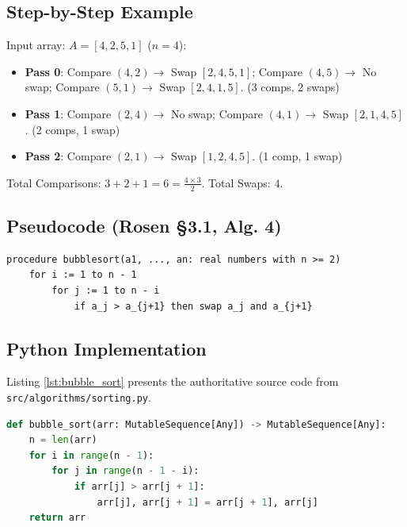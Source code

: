 \documentclass[11pt,a4paper,oneside]{report}
\theoremstyle{definition}
\begin{document}
\subsection{Step-by-Step Example}
Input array: $A = [4, 2, 5, 1]$ ($n = 4$):
\begin{itemize}
    \item \textbf{Pass 0}: Compare $(4, 2) \to$ Swap $[2, 4, 5, 1]$; Compare $(4, 5) \to$ No swap; Compare $(5, 1) \to$ Swap $[2, 4, 1, 5]$. (3 comps, 2 swaps)
    \item \textbf{Pass 1}: Compare $(2, 4) \to$ No swap; Compare $(4, 1) \to$ Swap $[2, 1, 4, 5]$. (2 comps, 1 swap)
    \item \textbf{Pass 2}: Compare $(2, 1) \to$ Swap $[1, 2, 4, 5]$. (1 comp, 1 swap)
\end{itemize}
Total Comparisons: $3 + 2 + 1 = 6 = \frac{4 \times 3}{2}$. Total Swaps: $4$.

\subsection{Pseudocode (Rosen §3.1, Alg. 4)}
\begin{lstlisting}[caption={Pseudocode: Bubble Sort (Rosen §3.1, Algorithm 4)}]
procedure bubblesort(a1, ..., an: real numbers with n >= 2)
    for i := 1 to n - 1
        for j := 1 to n - i
            if a_j > a_{j+1} then swap a_j and a_{j+1}
\end{lstlisting}

\subsection{Python Implementation}
Listing \ref{lst:bubble_sort} presents the authoritative source code from \texttt{src/algorithms/sorting.py}.

\begin{lstlisting}[language=Python, caption={Authoritative Implementation of Bubble Sort}, label={lst:bubble_sort}]
def bubble_sort(arr: MutableSequence[Any]) -> MutableSequence[Any]:
    n = len(arr)
    for i in range(n - 1):
        for j in range(n - 1 - i):
            if arr[j] > arr[j + 1]:
                arr[j], arr[j + 1] = arr[j + 1], arr[j]
    return arr
\end{lstlisting}
\end{document}
